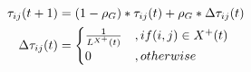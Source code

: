 \begin{align}
    \tau_{ij}(t+1) &= (1-\rho_G) * \tau_{ij}(t) + \rho_G * \Delta \tau_{ij}(t) \\
    \Delta \tau_{ij}(t) &=    
    \begin{cases}
         $$ \frac{1}{L^{X^+}(t)}  $$ &, if $$ (i,j) \in X^+(t) $$ \\ 
        0 &, otherwise
    \end{cases}        
\end{align}
